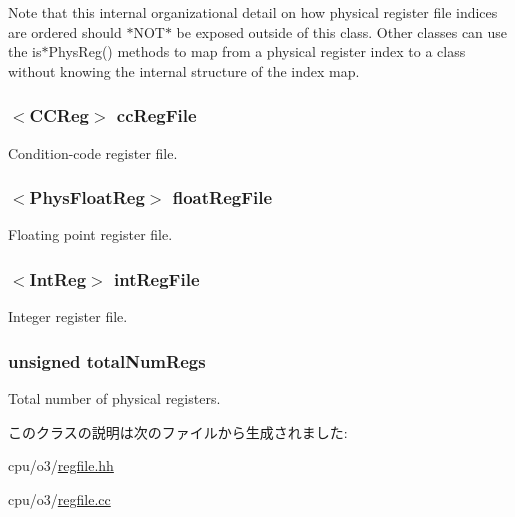 Note that this internal organizational detail on how physical register file indices are ordered should $\ast$NOT$\ast$ be exposed outside of this class. Other classes can use the is$\ast$PhysReg() methods to map from a physical register index to a class without knowing the internal structure of the index map. \hypertarget{classPhysRegFile_af4b24547ef531657fa5164d3acb7e702}{
\subsubsection[{ccRegFile}]{$<${\bf CCReg}$>$ {\bf ccRegFile}}}
\label{classPhysRegFile_af4b24547ef531657fa5164d3acb7e702}
Condition-\/code register file. \hypertarget{classPhysRegFile_a343937a7a6cc0c222be87f51add84a18}{
\subsubsection[{floatRegFile}]{$<${\bf PhysFloatReg}$>$ {\bf floatRegFile}}}
\label{classPhysRegFile_a343937a7a6cc0c222be87f51add84a18}
Floating point register file. \hypertarget{classPhysRegFile_a65b23a22006c5cf9aed0fadb3d764c34}{
\subsubsection[{intRegFile}]{$<${\bf IntReg}$>$ {\bf intRegFile}}}
\label{classPhysRegFile_a65b23a22006c5cf9aed0fadb3d764c34}
Integer register file. \hypertarget{classPhysRegFile_ae81cfbdd726e306beca09f7e80eb5cdb}{
\subsubsection[{totalNumRegs}]{\setlength{\rightskip}{0pt plus 5cm}unsigned {\bf totalNumRegs}}}
\label{classPhysRegFile_ae81cfbdd726e306beca09f7e80eb5cdb}
Total number of physical registers. 

このクラスの説明は次のファイルから生成されました:\begin{DoxyCompactItemize}
\item 
cpu/o3/\hyperlink{regfile_8hh}{regfile.hh}\item 
cpu/o3/\hyperlink{regfile_8cc}{regfile.cc}\end{DoxyCompactItemize}
